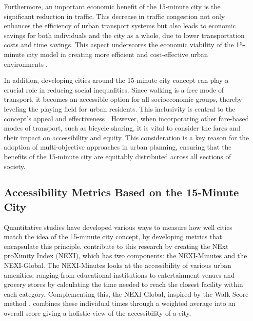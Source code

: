 Furthermore, an important economic benefit of the 15-minute city is the significant reduction in traffic. 
This decrease in traffic congestion not only enhances the efficiency of urban transport systems but also leads to economic savings for both individuals and the city as a whole, due to lower transportation costs and time savings.
This aspect underscores the economic viability of the 15-minute city model in creating more efficient and cost-effective urban environments .

In addition, developing cities around the 15-minute city concept can play a crucial role in reducing social inequalities. 
Since walking is a free mode of transport, it becomes an accessible option for all socioeconomic groups, thereby leveling the playing field for urban residents. 
This inclusivity is central to the concept's appeal and effectiveness .
However, when incorporating other fare-based modes of transport, such as bicycle sharing, it is vital to consider the fares and their impact on accessibility and equity. 
This consideration is a key reason for the adoption of multi-objective approaches in urban planning, ensuring that the benefits of the 15-minute city are equitably distributed across all sections of society.


\subsection{Accessibility Metrics Based on the 15-Minute City}
\label{subsec:accessibility_metrics_based_on_the_15_minute_city}

Quantitative studies have developed various ways to measure how well cities match the idea of the 15-minute city concept,  by developing metrics that encapsulate this principle.  
 contribute to this research by creating the NExt proXimity Index (NEXI), which has two components: the NEXI-Minutes and the NEXI-Global. 
The NEXI-Minutes looks at the accessibility of various urban amenities, ranging from educational institutions to entertainment venues and grocery stores by calculating the time needed to reach the closest facility within each category.
Complementing this, the NEXI-Global, inspired by the Walk Score method , combines these individual times through a weighted average into an overall score giving a holistic view of the accessibility of a city.

